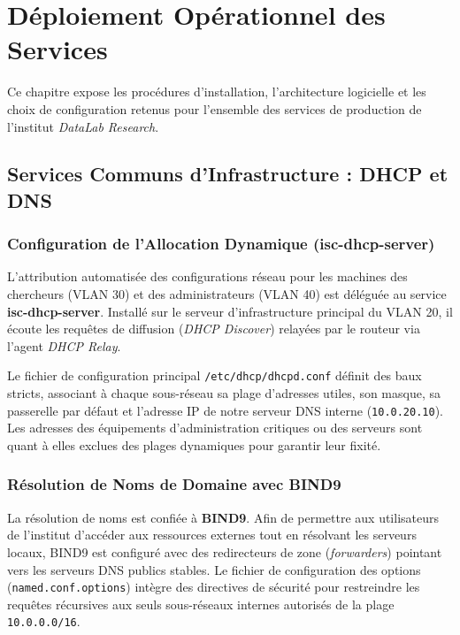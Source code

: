 \chapter{Déploiement Opérationnel des Services}
\label{chap:deploiement_services}

Ce chapitre expose les procédures d'installation, l'architecture logicielle et les choix de configuration retenus pour l'ensemble des services de production de l'institut \textit{DataLab Research}.

\section{Services Communs d'Infrastructure : DHCP et DNS}

\subsection{Configuration de l'Allocation Dynamique (isc-dhcp-server)}
L'attribution automatisée des configurations réseau pour les machines des chercheurs (VLAN 30) et des administrateurs (VLAN 40) est déléguée au service \textbf{isc-dhcp-server}. Installé sur le serveur d'infrastructure principal du VLAN 20, il écoute les requêtes de diffusion (\textit{DHCP Discover}) relayées par le routeur via l'agent \textit{DHCP Relay}.

Le fichier de configuration principal \texttt{/etc/dhcp/dhcpd.conf} définit des baux stricts, associant à chaque sous-réseau sa plage d'adresses utiles, son masque, sa passerelle par défaut et l'adresse IP de notre serveur DNS interne (\texttt{10.0.20.10}). Les adresses des équipements d'administration critiques ou des serveurs sont quant à elles exclues des plages dynamiques pour garantir leur fixité.

\subsection{Résolution de Noms de Domaine avec BIND9}
La résolution de noms est confiée à \textbf{BIND9}. Afin de permettre aux utilisateurs de l'institut d'accéder aux ressources externes tout en résolvant les serveurs locaux, BIND9 est configuré avec des redirecteurs de zone (\textit{forwarders}) pointant vers les serveurs DNS publics stables. Le fichier de configuration des options (\texttt{named.conf.options}) intègre des directives de sécurité pour restreindre les requêtes récursives aux seuls sous-réseaux internes autorisés de la plage \texttt{10.0.0.0/16}.

